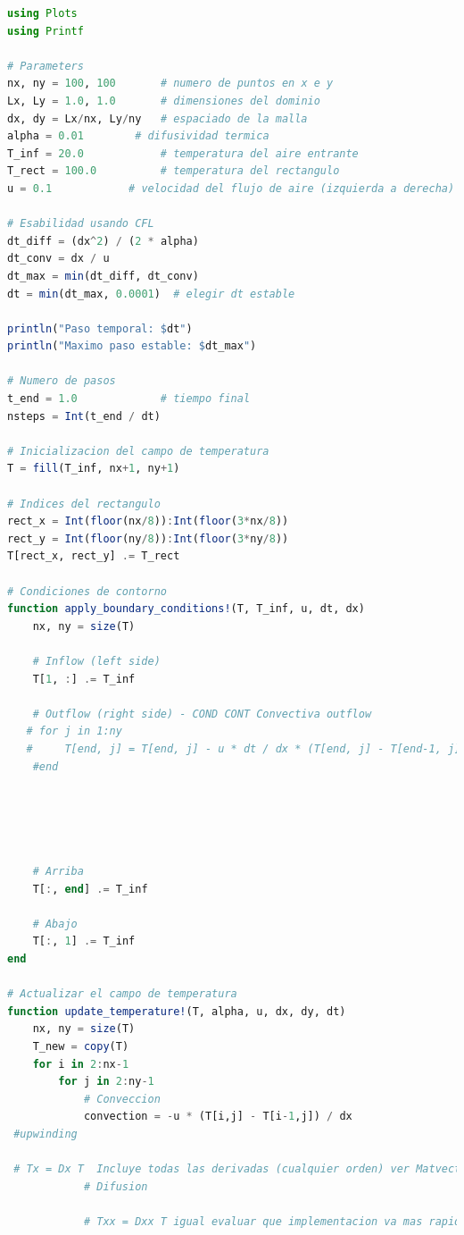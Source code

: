 \begin{lstlisting}[language=Julia]
using Plots
using Printf

# Parameters
nx, ny = 100, 100       # numero de puntos en x e y
Lx, Ly = 1.0, 1.0       # dimensiones del dominio
dx, dy = Lx/nx, Ly/ny   # espaciado de la malla
alpha = 0.01        # difusividad termica
T_inf = 20.0            # temperatura del aire entrante
T_rect = 100.0          # temperatura del rectangulo
u = 0.1            # velocidad del flujo de aire (izquierda a derecha)

# Esabilidad usando CFL 
dt_diff = (dx^2) / (2 * alpha)
dt_conv = dx / u
dt_max = min(dt_diff, dt_conv)
dt = min(dt_max, 0.0001)  # elegir dt estable

println("Paso temporal: $dt")
println("Maximo paso estable: $dt_max")

# Numero de pasos
t_end = 1.0             # tiempo final
nsteps = Int(t_end / dt)

# Inicializacion del campo de temperatura
T = fill(T_inf, nx+1, ny+1)

# Indices del rectangulo
rect_x = Int(floor(nx/8)):Int(floor(3*nx/8))
rect_y = Int(floor(ny/8)):Int(floor(3*ny/8))
T[rect_x, rect_y] .= T_rect

# Condiciones de contorno
function apply_boundary_conditions!(T, T_inf, u, dt, dx)
    nx, ny = size(T)
    
    # Inflow (left side)
    T[1, :] .= T_inf
    
    # Outflow (right side) - COND CONT Convectiva outflow 
   # for j in 1:ny
   #     T[end, j] = T[end, j] - u * dt / dx * (T[end, j] - T[end-1, j])
    #end
    
    



    # Arriba 
    T[:, end] .= T_inf
    
    # Abajo 
    T[:, 1] .= T_inf
end

# Actualizar el campo de temperatura
function update_temperature!(T, alpha, u, dx, dy, dt)
    nx, ny = size(T)
    T_new = copy(T)
    for i in 2:nx-1
        for j in 2:ny-1
            # Conveccion
            convection = -u * (T[i,j] - T[i-1,j]) / dx
 #upwinding
 
 # Tx = Dx T  Incluye todas las derivadas (cualquier orden) ver Matvect/ matmat// para ver comparacion(tiempo y resultados) u*gradT
            # Difusion

            # Txx = Dxx T igual evaluar que implementacion va mas rapido Dxx la calculas una vez 


\end{lstlisting}
